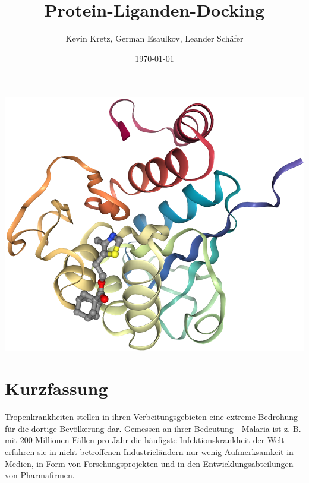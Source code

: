 \documentclass[11pt]{article}
\title{Protein-Liganden-Docking}
\author{Kevin Kretz, German Esaulkov, Leander Schäfer}
\date{\today}
\begin{document}


    \maketitle

    \includegraphics[width=\linewidth]{protein-ligand}

    \pagebreak

    \tableofcontents


    \section{Kurzfassung}\label{sec:kurzfassung}



    Tropenkrankheiten stellen in ihren Verbeitungsgebieten eine extreme Bedrohung für die dortige Bevölkerung dar. Gemessen an ihrer Bedeutung - Malaria ist z. B. mit 200 Millionen Fällen pro Jahr die häufigste Infektionskrankheit der Welt  - erfahren sie in nicht betroffenen Industrieländern nur wenig Aufmerksamkeit in Medien, in Form von Forschungsprojekten und in den Entwicklungsabteilungen von Pharmafirmen.
\end{document}
